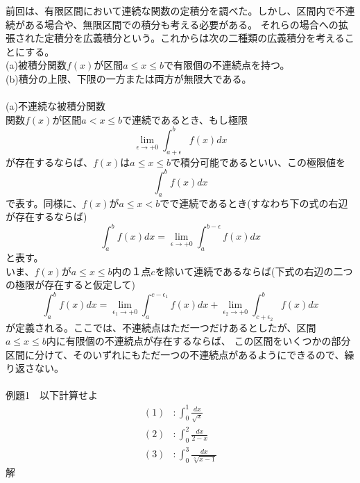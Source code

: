 \documentclass[a4j,dvipdfmx]{jsarticle}
\begin{document}
前回は、有限区間において連続な関数の定積分を調べた。しかし、区間内で不連続がある場合や、無限区間での積分も考える必要がある。
それらの場合への拡張された定積分を広義積分という。これからは次の二種類の広義積分を考えることにする。\\
(a)被積分関数$f(x)$が区間$a\leq x\leq b$で有限個の不連続点を持つ。\\
(b)積分の上限、下限の一方または両方が無限大である。\\\\
(a)不連続な被積分関数\\
関数$f(x)$が区間$a < x \leq b$で連続であるとき、もし極限
\begin{equation}
    \lim_{\epsilon\to +0}\int_{a+\epsilon}^b f(x)dx
\end{equation}
が存在するならば、$f(x)$は$a\leq x\leq b$で積分可能であるといい、この極限値を
\begin{equation}
    \int_{a}^b f(x)dx
\end{equation}
で表す。同様に、$f(x)$が$a\leq x<b$でで連続であるとき(すなわち下の式の右辺が存在するならば)
\begin{equation}
    \int_{a}^b f(x)dx = \lim_{\epsilon\to +0}\int_a^{b-\epsilon} f(x)dx
\end{equation}
と表す。\\
いま、$f(x)$が$a\leq x\leq b$内の１点$c$を除いて連続であるならば(下式の右辺の二つの極限が存在すると仮定して)
\begin{equation}
    \int_a^b f(x)dx = \lim_{\epsilon_1\to+0}\int_a^{c-\epsilon_1}f(x)dx +\lim_{\epsilon_2\to+0}\int_{c+\epsilon_2}^bf(x)dx 
\end{equation}
が定義される。ここでは、不連続点はただ一つだけあるとしたが、区間$a\leq x\leq b$内に有限個の不連続点が存在するならば、
この区間をいくつかの部分区間に分けて、そのいずれにもただ一つの不連続点があるようにできるので、繰り返さない。\\\\
例題1　以下計算せよ\\
\begin{align*}
    (1)&:\int_0^1\frac{dx}{\sqrt{x}}\\
    (2)&:\int_0^2\frac{dx}{2-x}\\
    (3)&:\int_0^3\frac{dx}{\sqrt[3]{x-1}}
\end{align*}
解\\
\end{document}
